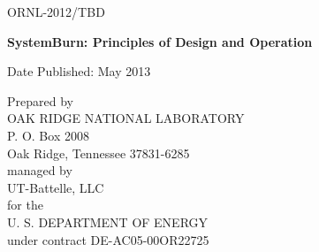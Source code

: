 \documentclass[11pt]{article}
\begin{document}
\newpage

\begin{titlepage}

\begin{flushright}ORNL-2012/TBD
\end{flushright}

\vspace{1.25in}

\begin{center}
{\bf{
SystemBurn: Principles of Design and Operation
}}
\vspace{0.5in}

\author{\\
Jeffery A. Kuehn, Stephen W. Poole, Stephen W. Hodson, \\
Joshua K. Lothian, Jonathan D. Dobson, David B. Reister, \\
Nicholas R. Lewkow, S. Ross Glandon,  Jacob T. Peek, \\
Matthew B. Baker \\
\\
The Extreme Scale Systems Center \\
Computer Science and Mathematics Division \\
Oak Ridge National Laboratory \\
Oak Ridge, TN 37831 \\
http://www.csm.ornl.gov/essc\\
\\
\\
kuehn@ornl.gov, spoole@ornl.gov, hodsonsw@ornl.gov,\\
lothian@ornl.gov, dobsonjd@ornl.gov, dbr@ornl.gov, \\
lewkownr@ornl.gov, glandonsr@ornl.gov, peekjt@ornl.gov\\
}


\vspace{1in}

Date Published: May 2013

\vspace{1in}

Prepared by \\
OAK RIDGE NATIONAL LABORATORY \\
P. O. Box 2008 \\
Oak Ridge, Tennessee 37831-6285 \\
managed by \\
UT-Battelle, LLC \\
for the \\
U. S. DEPARTMENT OF ENERGY \\
under contract DE-AC05-00OR22725

\end{center}

\end{titlepage}
\end{document}
